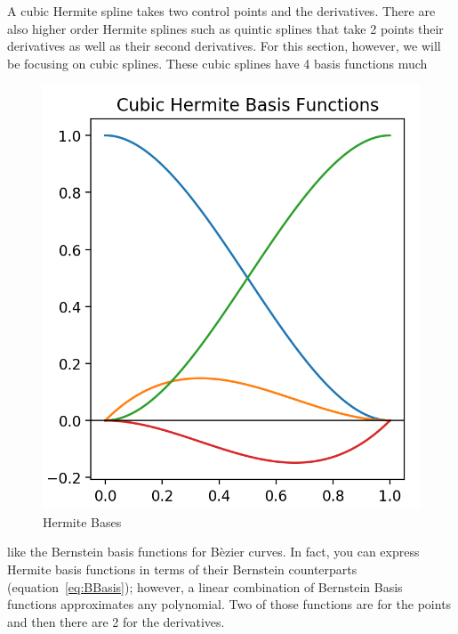 \documentclass[12pt, letterpaper]{article}
\begin{document}
A cubic Hermite spline takes two control points and the derivatives. There are also higher order Hermite
splines such as quintic splines that take 2 points their derivatives as well as their second derivatives. For
this section, however, we will be focusing on cubic splines. These cubic splines have 4 basis functions much
\begin{figure}
  \centering
  \caption{Hermite Bases}
  \label{fig:HBasisGraphs}
  \includegraphics[width=\linewidth]{Basis/HBasis}
  \vspace{-10pt}
\end{figure}
like the Bernstein basis functions for B\`ezier curves. In fact, you can express Hermite basis functions in
terms of their Bernstein counterparts (equation~\ref{eq:BBasis}); however, a linear combination of Bernstein
Basis functions approximates any polynomial. Two of those functions are for the points and then there are 2 
for the derivatives.
\end{document}
